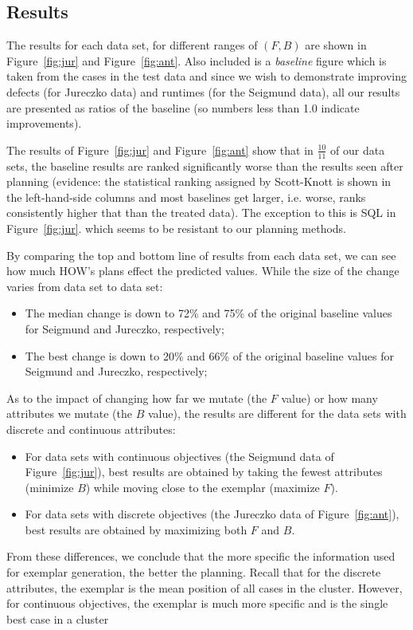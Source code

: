 \documentclass[conference]{IEEEtran}
\newcommand{\bi}{\begin{itemize}}
\newcommand{\ei}{\end{itemize}}
\newcommand{\fig}[1]{Figure~\ref{fig:#1}}
\begin{document}
  
\subsection{Results}
The results for each data set, for different ranges of $(F,B)$ are shown in \fig{jur} and \fig{ant}.
Also included is a {\em baseline} figure which is taken from the cases in the test data
and since we wish to demonstrate
improving defects
(for Jureczko data) and runtimes (for the Seigmund data), all our results are presented as ratios of the baseline (so numbers less than 1.0 indicate improvements).

  
 The   results of \fig{jur} and \fig{ant} show that in $\frac{10}{11}$ of our
 data sets, the baseline results are ranked significantly worse than the results seen
 after planning (evidence: the statistical ranking assigned by Scott-Knott is shown in the left-hand-side columns and most baselines get larger, i.e. worse, ranks consistently higher that than the treated data). The exception to this is SQL in  \fig{jur}. which
 seems to
 be resistant to our planning methods.
 
 By comparing the top and bottom line of results from each data set, we can see how much HOW's
 plans effect the predicted values. While the  size of the change varies from data set to data set:
 \bi
 \item The median change is down to 72\% and 75\%  of the original baseline values for Seigmund and Jureczko, respectively;
 \item The best change is down to 20\% and 66\% of the original baseline values for Seigmund and Jureczko, respectively;
 \ei
 As to the impact of changing how far we mutate (the $F$ value) or how many attributes
 we mutate (the $B$ value), the results are different for the data sets with discrete and continuous attributes:
 \bi
 \item For data sets with continuous objectives (the Seigmund  data of \fig{jur}),
 best results are obtained by taking the fewest attributes (minimize $B$) 
 while moving close to the exemplar (maximize $F$).
 \item For data sets with discrete objectives (the Jureczko data  of \fig{ant}),
 best results are obtained by maximizing both $F$ and $B$.
 \ei
  From these differences, we conclude that the more specific the  information used for exemplar
 generation, the better the planning. Recall that for the discrete
 attributes, the exemplar is the mean position of all cases in the cluster.
 However,  for continuous
 objectives, the exemplar is much more specific and is the  single  best case in a cluster 
\end{document}
